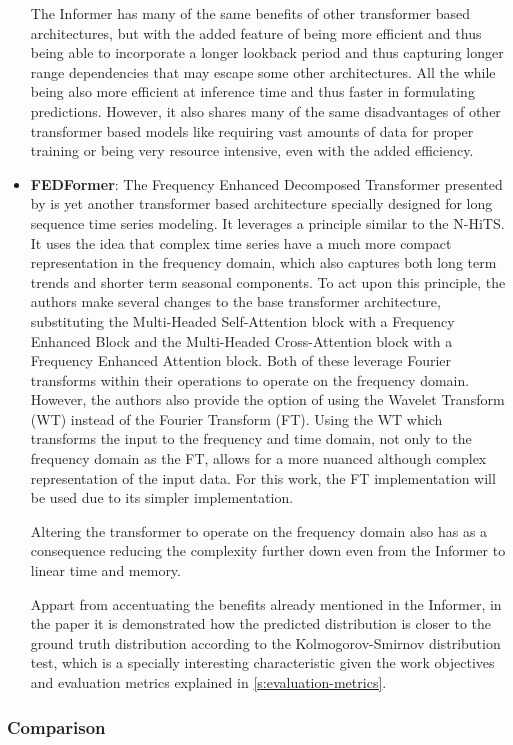 \begin{itemize}
    The Informer has many of the same benefits of other transformer based architectures, but with the added feature of being more efficient and thus being able to incorporate a longer lookback period and thus capturing longer range dependencies that may escape some other architectures. All the while being also more efficient at inference time and thus faster in formulating predictions. However, it also shares many of the same disadvantages of other transformer based models like requiring vast amounts of data for proper training or being very resource intensive, even with the added efficiency.  
    \item \textbf{FEDFormer}: The Frequency Enhanced Decomposed Transformer presented by \cite{zhou_ma_wen_wang_sun_jin_2022} is yet another transformer based architecture specially designed for long sequence time series modeling. It leverages a principle similar to the N-HiTS. It uses the idea that complex time series have a much more compact representation in the frequency domain, which also captures both long term trends and shorter term seasonal components. To act upon this principle, the authors make several changes to the base transformer architecture, substituting the Multi-Headed Self-Attention block with a Frequency Enhanced Block and the Multi-Headed Cross-Attention block with a Frequency Enhanced Attention block. Both of these leverage Fourier transforms within their operations to operate on the frequency domain. However, the authors also provide the option of using the Wavelet Transform (WT) instead of the Fourier Transform (FT). Using the WT which transforms the input to the frequency and time domain, not only to the frequency domain as the FT, allows for a more nuanced although complex representation of the input data. For this work, the FT implementation will be used due to its simpler implementation. 
    
    Altering the transformer to operate on the frequency domain also has as a consequence reducing the complexity further down even from the Informer to linear time and memory. 
    
    Appart from accentuating the benefits already mentioned in the Informer, in the paper it is demonstrated how the predicted distribution is closer to the ground truth distribution according to the Kolmogorov-Smirnov distribution test, which is a specially interesting characteristic given the work objectives and evaluation metrics explained in \autoref{s:evaluation-metrics}.
\end{itemize} 
\subsubsection{Comparison}

